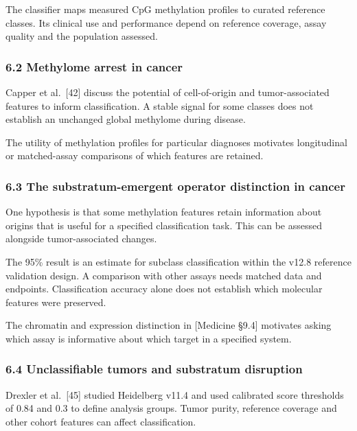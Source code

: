 \documentclass[
]{article}
\begin{document}
The classifier maps measured CpG methylation profiles to curated
reference classes. Its clinical use and performance depend on reference
coverage, assay quality and the population assessed.

\hypertarget{methylome-arrest-in-cancer}{%
\subsubsection{6.2 Methylome arrest in
cancer}\label{methylome-arrest-in-cancer}}

Capper et al.~{[}42{]} discuss the potential of cell-of-origin and
tumor-associated features to inform classification. A stable signal for
some classes does not establish an unchanged global methylome during
disease.

The utility of methylation profiles for particular diagnoses motivates
longitudinal or matched-assay comparisons of which features are
retained.

\hypertarget{the-substratum-emergent-operator-distinction-in-cancer}{%
\subsubsection{6.3 The substratum-emergent operator distinction in
cancer}\label{the-substratum-emergent-operator-distinction-in-cancer}}

One hypothesis is that some methylation features retain information
about origins that is useful for a specified classification task. This
can be assessed alongside tumor-associated changes.

The 95\% result is an estimate for subclass classification within the
v12.8 reference validation design. A comparison with other assays needs
matched data and endpoints. Classification accuracy alone does not
establish which molecular features were preserved.

The chromatin and expression distinction in {[}Medicine §9.4{]}
motivates asking which assay is informative about which target in a
specified system.

\hypertarget{unclassifiable-tumors-and-substratum-disruption}{%
\subsubsection{6.4 Unclassifiable tumors and substratum
disruption}\label{unclassifiable-tumors-and-substratum-disruption}}

Drexler et al.~{[}45{]} studied Heidelberg v11.4 and used calibrated
score thresholds of 0.84 and 0.3 to define analysis groups. Tumor
purity, reference coverage and other cohort features can affect
classification.
\end{document}
